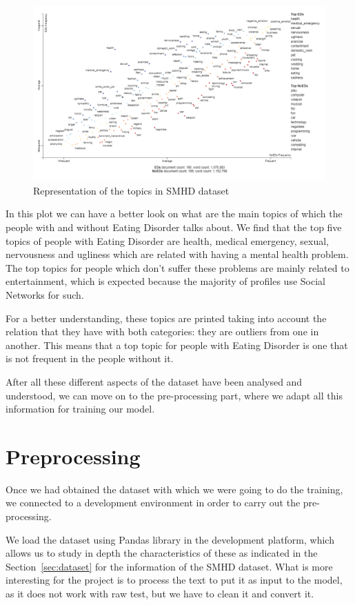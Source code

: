 \begin{figure}[!htp]
    \centering
    \includegraphics[scale=0.7]{img/detection/empath_scattertext.png}
    \caption{Representation of the topics in SMHD dataset}
    \label{fig:empath-scattertext}
\end{figure}

In this plot we can have a better look on what are the main topics of which the people with and without Eating Disorder talks about. We find that the top five topics of people with Eating Disorder are health, medical emergency, sexual, nervousness and ugliness which are related with having a mental health problem. The top topics for people which don't suffer these problems are mainly related to entertainment, which is expected because the majority of profiles use Social Networks for such.

For a better understanding, these topics are printed taking into account the relation that they have with both categories: they are outliers from one in another. This means that a top topic for people with Eating Disorder is one that is not frequent in the people without it.

After all these different aspects of the dataset have been analysed and understood, we can move on to the pre-processing part, where we adapt all this information for training our model.

\section{Preprocessing}
\label{sec:preprocessing}
Once we had obtained the dataset with which we were going to do the training, we connected to a development environment in order to carry out the pre-processing. 

We load the dataset using Pandas library in the development platform, which allows us to study in depth the characteristics of these as indicated in the Section~\ref{sec:dataset} for the information of the SMHD dataset. What is more interesting for the project is to process the text to put it as input to the model, as it does not work with raw test, but we have to clean it and convert it.

